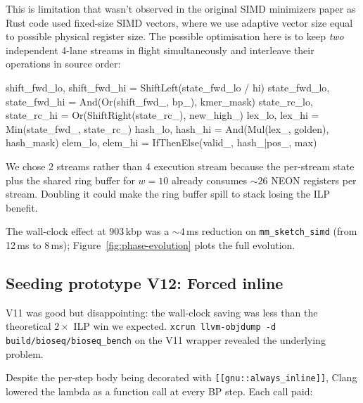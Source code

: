 This is limitation that wasn't observed in the original SIMD minimizers paper as Rust code used fixed-size SIMD vectors, where we use adaptive vector size equal to possible physical register size.
The possible optimisation here is to keep \emph{two} independent 4-lane streams in flight
simultaneously and interleave their operations in source order:

\begin{BioseqCppSnippet}
shift_fwd_lo, shift_fwd_hi = ShiftLeft(state_fwd_lo / hi)
state_fwd_lo, state_fwd_hi = And(Or(shift_fwd_, bp_), kmer_mask)
state_rc_lo,  state_rc_hi  = Or(ShiftRight(state_rc_), new_high_)
lex_lo,       lex_hi       = Min(state_fwd_, state_rc_)
hash_lo,      hash_hi      = And(Mul(lex_, golden), hash_mask)
elem_lo,      elem_hi      = IfThenElse(valid_, hash_|pos_, max)
\end{BioseqCppSnippet}

We chose 2 streams rather than 4 execution stream because the per-stream
state plus the shared ring buffer for $w=10$ already consumes
$\sim 26$ NEON registers per stream. Doubling it could make the ring buffer
spill to stack losing the ILP benefit.

The wall-clock effect at 903\,kbp was a $\sim 4$\,ms reduction on
\texttt{mm\_sketch\_simd} (from 12\,ms to 8\,ms);
Figure~\ref{fig:phase-evolution} plots the full evolution.

\subsection{Seeding prototype V12: Forced inline}

V11 was good but disappointing: the wall-clock saving was less than
the theoretical $2\times$ ILP win we expected.
\texttt{xcrun llvm-objdump -d build/bioseq/bioseq\_bench} on the V11
wrapper revealed the underlying problem. 


Despite the per-step body being decorated with
\texttt{[[gnu::always\_inline]]}, Clang lowered the lambda as a
function call at every BP step.  Each call paid:

